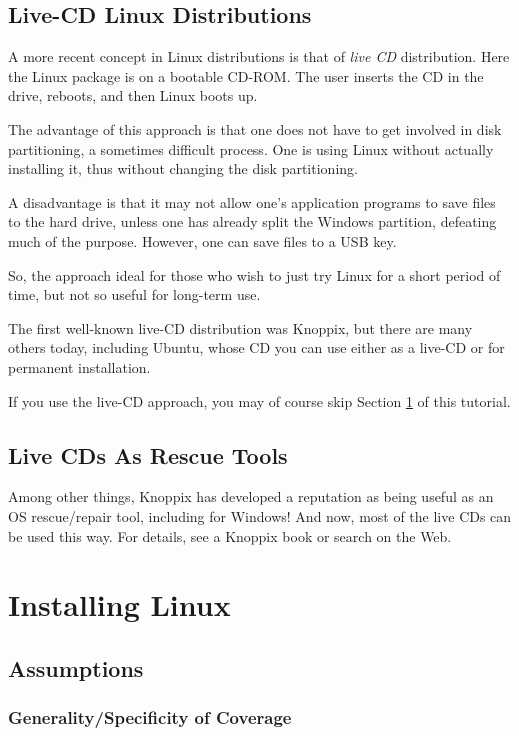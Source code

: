 \documentclass[11pt]{article}
\begin{document}
\subsection{Live-CD Linux Distributions}
\label{live}

A more recent concept in Linux distributions is that of {\it live CD}
distribution.  Here the Linux package is on a bootable CD-ROM.  The user
inserts the CD in the drive, reboots, and then Linux boots up.

The advantage of this approach is that one does not have to get involved
in disk partitioning, a sometimes difficult process.  One is using Linux
without actually installing it, thus without changing the disk
partitioning.

A disadvantage is that it may not allow one's application programs to
save files to the hard drive, unless one has already split the Windows
partition, defeating much of the purpose.  However, one can save files
to a USB key. 

So, the approach ideal for those who wish to just try Linux for a short
period of time, but not so useful for long-term use. 

The first well-known live-CD distribution was Knoppix, but there are
many others today, including Ubuntu, whose CD you can use either as a
live-CD or for permanent installation.  

If you use the live-CD approach, you may of course skip Section
\ref{install} of this tutorial.

\subsection{Live CDs As Rescue Tools}

Among other things, Knoppix has developed a reputation as being useful
as an OS rescue/repair tool, including for Windows!  And now, most of
the live CDs can be used this way.  For details, see a Knoppix book or
search on the Web.

\section{Installing Linux}
\label{install}

\subsection{Assumptions}

\subsubsection{Generality/Specificity of Coverage}
\end{document}

